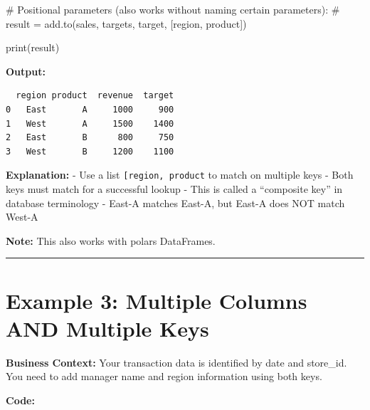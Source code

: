 \documentclass[
  letterpaper,
]{scrbook}
\newenvironment{Shaded}{\begin{snugshade}}{\end{snugshade}}
\newcommand{\BuiltInTok}[1]{\textcolor[rgb]{0.00,0.23,0.31}{#1}}
\newcommand{\CommentTok}[1]{\textcolor[rgb]{0.37,0.37,0.37}{#1}}
\newcommand{\NormalTok}[1]{\textcolor[rgb]{0.00,0.23,0.31}{#1}}
\begin{document}
\begin{Shaded}
\begin{Highlighting}[]
\CommentTok{\# Positional parameters (also works without naming certain parameters):}
\CommentTok{\# result = add.to(sales, targets, \textquotesingle{}target\textquotesingle{}, [\textquotesingle{}region\textquotesingle{}, \textquotesingle{}product\textquotesingle{}])}

\BuiltInTok{print}\NormalTok{(result)}
\end{Highlighting}
\end{Shaded}

\textbf{Output:}

\begin{verbatim}
  region product  revenue  target
0   East       A     1000     900
1   West       A     1500    1400
2   East       B      800     750
3   West       B     1200    1100
\end{verbatim}

\textbf{Explanation:} - Use a list
\texttt{{[}\textquotesingle{}region\textquotesingle{},\ \textquotesingle{}product\textquotesingle{}{]}}
to match on multiple keys - Both keys must match for a successful lookup
- This is called a ``composite key'' in database terminology - East-A
matches East-A, but East-A does NOT match West-A

\textbf{Note:} This also works with polars DataFrames.

\begin{center}\rule{0.5\linewidth}{0.5pt}\end{center}

\section{Example 3: Multiple Columns AND Multiple
Keys}\label{example-3-multiple-columns-and-multiple-keys}

\textbf{Business Context:} Your transaction data is identified by date
and store\_id. You need to add manager name and region information using
both keys.

\textbf{Code:}
\end{document}
